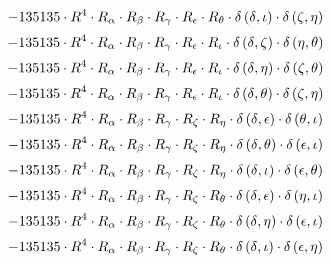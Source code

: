 \begin{subequations}
\begin{gather}
 \\[0.2em] \notag 		 - 135135 \cdot R^{4} \cdot R_{\alpha{}} \cdot R_{\beta{}} \cdot R_{\gamma{}} \cdot R_{\epsilon{}} \cdot R_{\theta{}} \cdot \delta{}\left(\delta{}, \iota{}\right) \cdot \delta{}\left(\zeta{}, \eta{}\right) 
 \\[0.2em] \notag 		 - 135135 \cdot R^{4} \cdot R_{\alpha{}} \cdot R_{\beta{}} \cdot R_{\gamma{}} \cdot R_{\epsilon{}} \cdot R_{\iota{}} \cdot \delta{}\left(\delta{}, \zeta{}\right) \cdot \delta{}\left(\eta{}, \theta{}\right) 
 \\[0.2em] \notag 		 - 135135 \cdot R^{4} \cdot R_{\alpha{}} \cdot R_{\beta{}} \cdot R_{\gamma{}} \cdot R_{\epsilon{}} \cdot R_{\iota{}} \cdot \delta{}\left(\delta{}, \eta{}\right) \cdot \delta{}\left(\zeta{}, \theta{}\right) 
 \\[0.2em] \notag 		 - 135135 \cdot R^{4} \cdot R_{\alpha{}} \cdot R_{\beta{}} \cdot R_{\gamma{}} \cdot R_{\epsilon{}} \cdot R_{\iota{}} \cdot \delta{}\left(\delta{}, \theta{}\right) \cdot \delta{}\left(\zeta{}, \eta{}\right) 
 \\[0.2em] \notag 		 - 135135 \cdot R^{4} \cdot R_{\alpha{}} \cdot R_{\beta{}} \cdot R_{\gamma{}} \cdot R_{\zeta{}} \cdot R_{\eta{}} \cdot \delta{}\left(\delta{}, \epsilon{}\right) \cdot \delta{}\left(\theta{}, \iota{}\right) 
 \\[0.2em] \notag 		 - 135135 \cdot R^{4} \cdot R_{\alpha{}} \cdot R_{\beta{}} \cdot R_{\gamma{}} \cdot R_{\zeta{}} \cdot R_{\eta{}} \cdot \delta{}\left(\delta{}, \theta{}\right) \cdot \delta{}\left(\epsilon{}, \iota{}\right) 
 \\[0.2em] \notag 		 - 135135 \cdot R^{4} \cdot R_{\alpha{}} \cdot R_{\beta{}} \cdot R_{\gamma{}} \cdot R_{\zeta{}} \cdot R_{\eta{}} \cdot \delta{}\left(\delta{}, \iota{}\right) \cdot \delta{}\left(\epsilon{}, \theta{}\right) 
 \\[0.2em] \notag 		 - 135135 \cdot R^{4} \cdot R_{\alpha{}} \cdot R_{\beta{}} \cdot R_{\gamma{}} \cdot R_{\zeta{}} \cdot R_{\theta{}} \cdot \delta{}\left(\delta{}, \epsilon{}\right) \cdot \delta{}\left(\eta{}, \iota{}\right) 
 \\[0.2em] \notag 		 - 135135 \cdot R^{4} \cdot R_{\alpha{}} \cdot R_{\beta{}} \cdot R_{\gamma{}} \cdot R_{\zeta{}} \cdot R_{\theta{}} \cdot \delta{}\left(\delta{}, \eta{}\right) \cdot \delta{}\left(\epsilon{}, \iota{}\right) 
 \\[0.2em] \notag 		 - 135135 \cdot R^{4} \cdot R_{\alpha{}} \cdot R_{\beta{}} \cdot R_{\gamma{}} \cdot R_{\zeta{}} \cdot R_{\theta{}} \cdot \delta{}\left(\delta{}, \iota{}\right) \cdot \delta{}\left(\epsilon{}, \eta{}\right) 

\end{gather}
\end{subequations}
